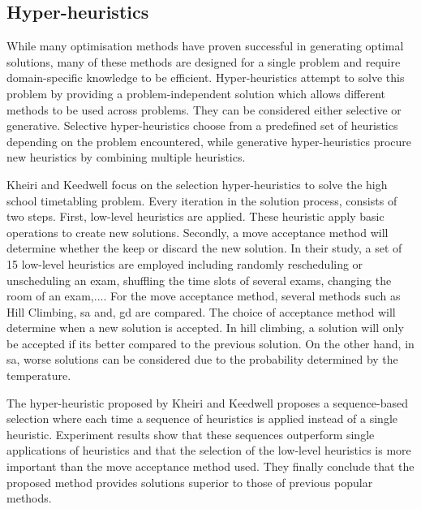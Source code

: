 \subsection{Hyper-heuristics}

While many optimisation methods have proven successful in generating optimal solutions, many of these methods are designed for a single problem and require domain-specific knowledge to be efficient. Hyper-heuristics attempt to solve this problem by providing a problem-independent solution which allows different methods to be used across problems. They can be considered either selective or generative. Selective hyper-heuristics choose from a predefined set of heuristics depending on the problem encountered, while generative hyper-heuristics procure new heuristics by combining multiple heuristics.

Kheiri and Keedwell \cite{kheiri2017} focus on the selection hyper-heuristics to solve the high school timetabling problem. Every iteration in the solution process, consists of two steps. First, low-level heuristics are applied. These heuristic apply basic operations to create new solutions. Secondly, a move acceptance method will determine whether the keep or discard the new solution. In their study, a set of 15 low-level heuristics are employed including randomly rescheduling or unscheduling an exam, shuffling the time slots of several exams, changing the room of an exam,.... For the move acceptance method, several methods such as Hill Climbing, \acrlong{sa} and, \acrlong{gd} are compared. The choice of acceptance method will determine when a new solution is accepted. In hill climbing, a solution will only be accepted if its better compared to the previous solution. On the other hand, in \acrlong{sa}, worse solutions can be considered due to the probability determined by the temperature.

The hyper-heuristic proposed by Kheiri and Keedwell proposes a sequence-based selection where each time a sequence of heuristics is applied instead of a single heuristic. Experiment results show that these sequences outperform single applications of heuristics and that the selection of the low-level heuristics is more important than the move acceptance method used. They finally conclude that the proposed method provides solutions superior to those of previous popular methods.

